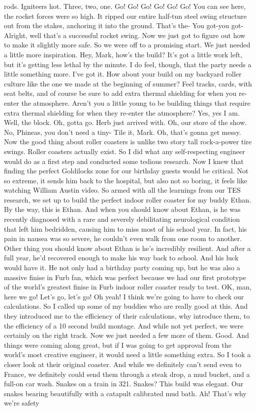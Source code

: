 \documentclass{article}
\begin{document}
rods. Igniteers hot. Three, two, one. Go! Go! Go! Go! Go! Go! You can see here, the rocket forces were so high. It ripped our entire half-tun steel swing structure out from the stakes, anchoring it into the ground. That's the- You got-you got- Alright, well that's a successful rocket swing. Now we just got to figure out how to make it slightly more safe. So we were off to a promising start. We just needed a little more inspiration. Hey, Mark, how's the build? It's got a little work left, but it's getting less lethal by the minute. I do feel, though, that the party needs a little something more. I've got it. How about your build on my backyard roller culture like the one we made at the beginning of summer? Feel tracks, cards, with seat belts, and of course be sure to add extra thermal shielding for when you re-enter the atmosphere. Aren't you a little young to be building things that require extra thermal shielding for when they re-enter the atmosphere? Yes, yes I am. Well, the block. Oh, gotta go. Herb just arrived with. Oh, our store of the show. No, Phineas, you don't need a tiny- Tile it, Mark. Oh, that's gonna get messy. Now the good thing about roller coasters is unlike two story tall rock-a-power tire swings. Roller coasters actually exist. So I did what any self-respecting engineer would do as a first step and conducted some tedious research. Now I knew that finding the perfect Goldilocks zone for our birthday guests would be critical. Not so extreme, it sends him back to the hospital, but also not so boring, it feels like watching William Austin video. So armed with all the learnings from our TES research, we set up to build the perfect indoor roller coaster for my buddy Ethan. By the way, this is Ethan. And when you should know about Ethan, is he was recently diagnosed with a rare and severely debilitating neurological condition that left him bedridden, causing him to miss most of his school year. In fact, his pain in nausea was so severe, he couldn't even walk from one room to another. Other thing you should know about Ethan is he's incredibly resilient. And after a full year, he'd recovered enough to make his way back to school. And his luck would have it. He not only had a birthday party coming up, but he was also a massive finise in Furb fan, which was perfect because we had our first prototype of the world's greatest finise in Furb indoor roller coaster ready to test. OK, man, here we go! Let's go, let's go! Oh yeah! I think we're going to have to check our calculations. So I called up some of my buddies who are really good at this. And they introduced me to the efficiency of their calculations, why introduce them, to the efficiency of a 10 second build montage. And while not yet perfect, we were certainly on the right track. Now we just needed a few more of them. Good. And things were coming along great, but if I was going to get approval from the world's most creative engineer, it would need a little something extra. So I took a closer look at their original coaster. And while we definitely can't send even to France, we definitely could send them through a steak drop, a mud bucket, and a full-on car wash. Snakes on a train in 321. Snakes? This build was elegant. Our snakes bearing beautifully with a catapult calibrated mud bath. Ah! That's why we're safety 
\end{document}
